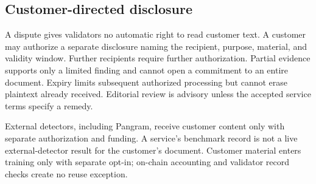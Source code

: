\subsection{Customer-directed disclosure}\label{customer-directed-evidence-disclosure}

A dispute gives validators no automatic right to read customer text. A customer
may authorize a separate disclosure naming the recipient, purpose, material,
and validity window. Further recipients require further authorization. Partial
evidence supports only a limited finding and cannot open a commitment to an
entire document. Expiry limits subsequent authorized processing but cannot
erase plaintext already received. Editorial review is advisory unless the
accepted service terms specify a remedy.

External detectors, including Pangram, receive customer content only with
separate authorization and funding. A service's benchmark record is not a live
external-detector result for the customer's document. Customer material enters
training only with separate opt-in; on-chain accounting and validator record
checks create no reuse exception.
